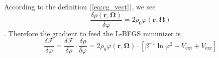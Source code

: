 According to the definition (\ref{eq:cg_vect}), we see
\begin{equation}
\frac{\delta\rho(\mathbf{r},\mathbf{\Omega})}{\delta\varphi}=2\rho_{0}\varphi(\mathbf{r},\mathbf{\Omega})
\end{equation}.
Therefore the gradient to feed the L-BFGS minimizer is
\begin{equation}
\frac{\delta\mathcal{F}}{\delta\varphi}=\frac{\delta\mathcal{F}}{\delta\rho}\cdot\frac{\delta\rho}{\delta\varphi}=2\rho_{0}\varphi(\mathbf{r},\mathbf{\Omega})\cdot\left[\beta^{-1}\ln\varphi^{2}+V_{\mathrm{ext}}+V_{\mathrm{exc}}\right]
\end{equation}

